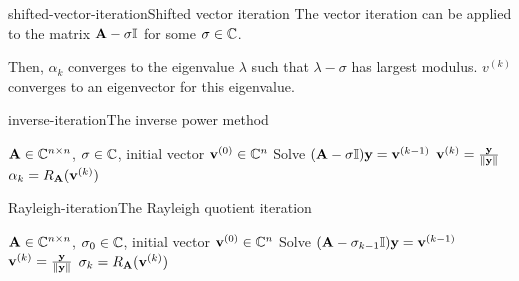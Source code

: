 \begin{Algorithm*}{shifted-vector-iteration}{Shifted vector iteration}
  The vector iteration can be applied to the matrix $\mathbf A-\sigma\mathbb I$
  for some $\sigma\in\mathbb C$.

  Then, $\alpha_k$ converges to the eigenvalue $\lambda$ such that
  $\lambda-\sigma$ has largest modulus. $v^{(k)}$ converges to an
  eigenvector for this eigenvalue.
\end{Algorithm*}

\begin{Algorithm*}{inverse-iteration}{The inverse power method}
    \begin{algorithmic}[1]
    \Require $\mathbf A\in\mathbb C^{n\times n}$, $\sigma\in\mathbb C$, initial vector $\mathbf v^{(0)}\in\mathbb C^n$
    \State Solve $(\mathbf A-\sigma\mathbb I) \mathbf y = \mathbf v^{(k-1)}$
    \State $\mathbf v^{(k)} = \frac{\mathbf y}{\lVert\mathbf y\rVert}$
    \State $\alpha_k = R_\mathbf A(\mathbf v^{(k)})$
    \EndFor
  \end{algorithmic}
\end{Algorithm*}

\begin{Algorithm*}{Rayleigh-iteration}{The Rayleigh quotient iteration}
    \begin{algorithmic}[1]
    \Require $\mathbf A\in\mathbb C^{n\times n}$, $\sigma_0\in\mathbb C$, initial vector $\mathbf v^{(0)}\in\mathbb C^n$
    \State Solve $(\mathbf A-\sigma_{k-1}\mathbb I) \mathbf y = \mathbf v^{(k-1)}$
    \State $\mathbf v^{(k)} = \frac{\mathbf y}{\lVert\mathbf y\rVert}$
    \State $\sigma_k = R_\mathbf A(\mathbf v^{(k)})$
    \EndFor
  \end{algorithmic}  
\end{Algorithm*}


